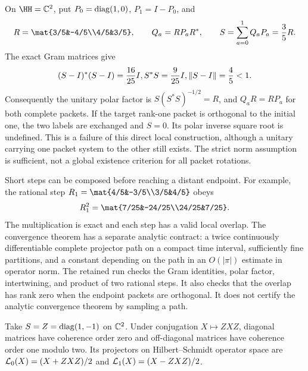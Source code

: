 On $\HH=\CC^2$, put $P_0=\operatorname{diag}(1,0)$, $P_1=I-P_0$, and
\[
R=\mat{3/5&-4/5\\4/5&3/5},\qquad Q_a=RP_aR^*,
\qquad S=\sum_{a=0}^1Q_aP_a=\frac35R.
\]
The exact Gram matrices give
\[
(S-I)^*(S-I)=\frac{16}{25}I, S^*S=\frac9{25}I,
\left\lVert S-I\right\rVert=\frac45<1.
\]
Consequently the unitary polar factor is $S(S^*S)^{-1/2}=R$, and $Q_aR=RP_a$ for both complete packets.
If the target rank-one packet is orthogonal to the initial one, the two labels are exchanged and $S=0$. Its polar inverse square root is undefined. This is a failure of this direct local construction, although a unitary carrying one packet system to the other still exists. The strict norm assumption is sufficient, not a global existence criterion for all packet rotations.

Short steps can be composed before reaching a distant endpoint. For example, the rational step $R_1=\mat{4/5&-3/5\\3/5&4/5}$ obeys
\[
R_1^2=\mat{7/25&-24/25\\24/25&7/25}.
\]
The multiplication is exact and each step has a valid local overlap. The convergence theorem has a separate analytic contract: a twice continuously differentiable complete projector path on a compact time interval, sufficiently fine partitions, and a constant depending on the path in an $O(|\pi|)$ estimate in operator norm.
The retained run checks the Gram identities, polar factor, intertwining, and product of two rational steps. It also checks that the overlap has rank zero when the endpoint packets are orthogonal. It does not certify the analytic convergence theorem by sampling a path.

Take $S=Z=\operatorname{diag}(1,-1)$ on $\CC^2$. Under conjugation $X\mapsto ZXZ$, diagonal matrices have coherence order zero and off-diagonal matrices have coherence order one modulo two. Its projectors on Hilbert--Schmidt operator space are $\Lcal_0(X)=(X+ZXZ)/2$ and $\Lcal_1(X)=(X-ZXZ)/2$.

